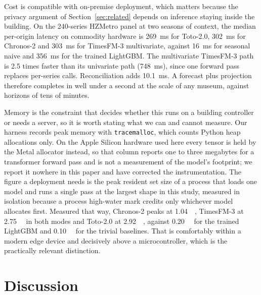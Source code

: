 \documentclass[11pt]{article}
\theoremstyle{plain}
\theoremstyle{definition}
\theoremstyle{remark}
\begin{document}
Cost is compatible with on-premise deployment, which matters because the privacy argument of Section~\ref{sec:related} depends on inference staying inside the building. On the \num{240}-series HZMetro panel at two seasons of context, the median per-origin latency on commodity hardware is \SI{269}{\milli\second} for Toto-2.0, \SI{302}{\milli\second} for Chronos-2 and \SI{303}{\milli\second} for TimesFM-3 multivariate, against \SI{16}{\milli\second} for seasonal naive and \SI{356}{\milli\second} for the trained LightGBM. The multivariate TimesFM-3 path is \num{2.5} times faster than its univariate path (\SI{748}{\milli\second}), since one forward pass replaces per-series calls. Reconciliation adds \SI{10.1}{\milli\second}. A forecast plus projection therefore completes in well under a second at the scale of any museum, against horizons of tens of minutes.

Memory is the constraint that decides whether this runs on a building controller or needs a server, so it is worth stating what we can and cannot measure. Our harness records peak memory with \texttt{tracemalloc}, which counts Python heap allocations only. On the Apple Silicon hardware used here every tensor is held by the Metal allocator instead, so that column reports one to three megabytes for a transformer forward pass and is not a measurement of the model's footprint; we report it nowhere in this paper and have corrected the instrumentation. The figure a deployment needs is the peak resident set size of a process that loads one model and runs a single pass at the largest shape in this study, measured in isolation because a process high-water mark credits only whichever model allocates first. Measured that way, Chronos-2 peaks at \SI{1.04}{\gibi\byte}, TimesFM-3 at \SI{2.75}{\gibi\byte} in both modes and Toto-2.0 at \SI{2.92}{\gibi\byte}, against \SI{0.20}{\gibi\byte} for the trained LightGBM and \SI{0.10}{\gibi\byte} for the trivial baselines. That is comfortably within a modern edge device and decisively above a microcontroller, which is the practically relevant distinction.

\section{Discussion}
\label{sec:discussion}
\end{document}
